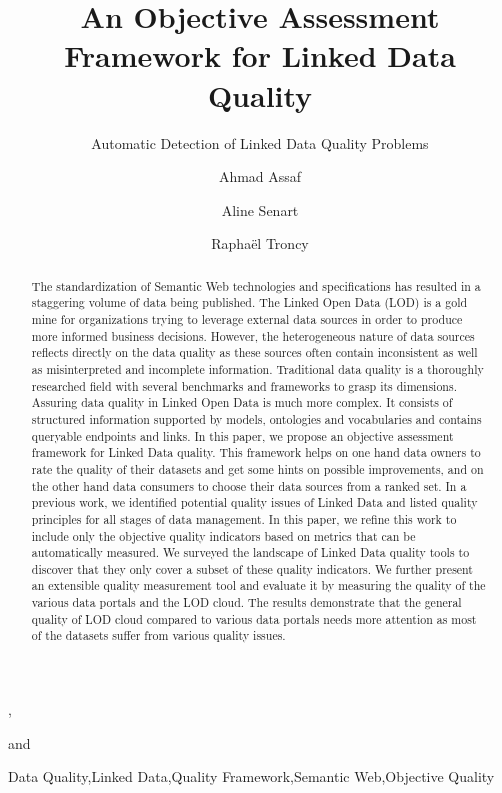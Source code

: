 \documentclass[onecolumn, crcready]{iosart2c}
\begin{document}
\begin{frontmatter}


\title{An Objective Assessment Framework for Linked Data Quality}
\subtitle{Automatic Detection of Linked Data Quality Problems}
\author[A,B]{Ahmad Assaf},\author[A]{Aline Senart} and
\author[B]{Rapha\"{e}l Troncy}
\address[A]{SAP Research, SAP Labs France SAS,\\
805 avenue du Dr. Maurice Donat, BP 1216, 06254 Mougins Cedex, France\\
}
\address[B]{EURECOM,\\
2229 route des cretes, 06560 Sophia Antipolis, France\\
}


\begin{abstract}
The standardization of Semantic Web technologies and specifications has resulted in a staggering volume of data being published. The Linked Open Data (LOD) is a gold mine for organizations trying to leverage external data sources in order to produce more informed business decisions. However, the heterogeneous nature of data sources reflects directly on the data quality as these sources often contain inconsistent as well as misinterpreted and incomplete information. Traditional data quality is a thoroughly researched field with several benchmarks and frameworks to grasp its dimensions. Assuring data quality in Linked Open Data is much more complex. It consists of structured information supported by models, ontologies and vocabularies and contains queryable endpoints and links. In this paper, we propose an objective assessment framework for Linked Data quality. This framework helps on one hand data owners to rate the quality of their datasets and get some hints on possible improvements, and on the other hand data consumers to choose their data sources from a ranked set. In a previous work, we identified potential quality issues of Linked Data and listed quality principles for all stages of data management. In this paper, we refine this work to include only the objective quality indicators based on metrics that can be automatically measured. We surveyed the landscape of Linked Data quality tools to discover that they only cover a subset of these quality indicators. We further present an extensible quality measurement tool and evaluate it by measuring the quality of the various data portals and the LOD cloud. The results demonstrate that the general quality of LOD cloud compared to various data portals needs more attention as most of the datasets suffer from various quality issues.
\end{abstract}

\begin{keyword}
Data Quality\sep Linked Data\sep Quality Framework\sep Semantic Web\sep Objective Quality
\end{keyword}
\end{frontmatter}
\end{document}
